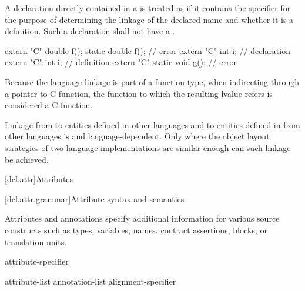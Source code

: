 \pnum
A declaration directly contained in a
is treated as if it contains the
specifier for the purpose of determining the linkage of the
declared name and whether it is a definition. Such a declaration shall
not have a .
\begin{example}
\begin{codeblock}
extern "C" double f();
static double f();                  // error
extern "C" int i;                   // declaration
extern "C" {
  int i;                            // definition
}
extern "C" static void g();         // error
\end{codeblock}
\end{example}

\pnum
\begin{note}
Because the language linkage is part of a function type, when
indirecting through a pointer to C function, the function to
which the resulting lvalue refers is considered a C function.
\end{note}

\pnum
{}%
%
Linkage from \Cpp{} to entities defined in other languages and to entities
defined in \Cpp{} from other languages is  and
language-dependent. Only where the object layout strategies of two
language implementations are similar enough can such linkage be
achieved.%

[dcl.attr]{Attributes}%

[dcl.attr.grammar]{Attribute syntax and semantics}

\pnum
{}%
Attributes and annotations specify additional information for various source constructs
such as types, variables, names, contract assertions, blocks, or translation units.

\begin{bnf}
\br
  attribute-specifier 
\end{bnf}

\begin{bnf}
\br
  \terminal{[} \terminal{[}  attribute-list \terminal{]} \terminal{]}\br
  \terminal{[} \terminal{[} annotation-list \terminal{]} \terminal{]}\br
  alignment-specifier
\end{bnf}

